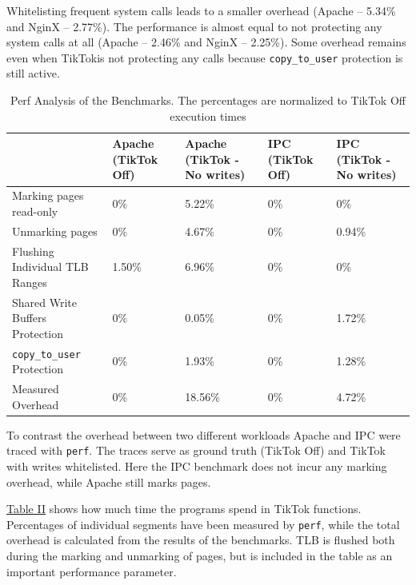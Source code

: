\documentclass[conference]{IEEEtran}
\newcommand{\sysname}{TikTok}
\begin{document}
Whitelisting frequent system calls leads to a smaller overhead (Apache -- 5.34\% and
NginX -- 2.77\%). The performance is almost equal to not protecting any
system calls at all (Apache -- 2.46\% and NginX -- 2.25\%). Some overhead
remains even when \sysname is not protecting any calls because
\texttt{copy\_to\_user} protection is still active.

\begin{table}[]
  \label{perftable}
  \centering
  \begin{tabular}{|l|l|l|l|l|}
  \hline
                                     & Apache (\sysname{} Off) & Apache (\sysname{} - No writes) & IPC (\sysname{} Off) & IPC (\sysname{} - No writes)\\ \hline
  Marking pages read-only            & 0\%    & 5.22\%          & 0\% & 0\%         \\ \hline
  Unmarking pages                    & 0\%    & 4.67\%          & 0\% & 0.94\%      \\ \hline
  Flushing Individual TLB Ranges     & 1.50\% & 6.96\%          & 0\% & 0\%         \\ \hline
  Shared Write Buffers Protection    & 0\%    & 0.05\%          & 0\% & 1.72\%      \\ \hline
  \texttt{copy\_to\_user} Protection & 0\%    & 1.93\%          & 0\% & 1.28\%      \\ \hline
  Measured Overhead                  & 0\%    & 18.56\%         & 0\% & 4.72\%      \\ \hline
  \end{tabular}
  \caption{Perf Analysis of the Benchmarks. The percentages are normalized to \sysname{} Off execution times}
\end{table}

To contrast the overhead between two different workloads Apache and IPC were
traced with \texttt{perf}. The traces serve as ground truth
(\sysname{} Off) and \sysname{} with writes whitelisted. Here the IPC benchmark
does not incur any marking overhead, while Apache still marks pages.

\hyperref[perftable]{Table II} shows how much time the programs spend in
\sysname{} functions. Percentages of individual segments have been measured by
\texttt{perf}, while the total overhead is calculated from the results of the
benchmarks. TLB is flushed both during the marking and unmarking of
pages, but is included in the table as an important performance parameter.
\end{document}
